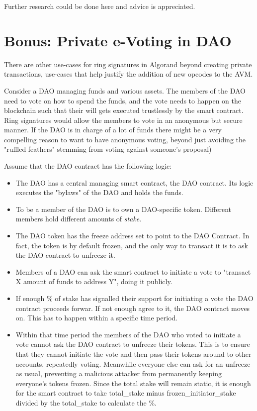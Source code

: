 \documentclass[9pt]{article}
\begin{document}
Further research could be done here and advice is appreciated.


\section{Bonus: Private e-Voting in DAO}

There are other use-cases for ring signatures in Algorand beyond creating private transactions, use-cases that help justify the addition of new opcodes to the AVM.

Consider a DAO managing funds and various assets. The members of the DAO need to vote on how to spend the funds, and the vote needs to happen on the blockchain such that their will gets executed trustlessly by the smart contract. Ring signatures would allow the members to vote in an anonymous but secure manner. If the DAO is in charge of a lot of funds there might be a very compelling reason to want to have anonymous voting, beyond just avoiding the "ruffled feathers" stemming from voting against someone's proposal)

Assume that the DAO contract has the following logic:

\begin{itemize}
    \item The DAO has a central managing smart contract, the DAO contract. Its logic executes the "bylaws" of the DAO and holds the funds.
    \item To be a member of the DAO is to own a DAO-specific token. Different members hold different amounts of \textit{stake}.
    \item The DAO token has the freeze address set to point to the DAO Contract. In fact, the token is by default frozen, and the only way to transact it is to ask the DAO contract to unfreeze it.
    \item Members of a DAO can ask the smart contract to initiate a vote to "transact X amount of funds to address Y", doing it publicly. 
    \item If enough \% of stake has signalled their support for initiating a vote the DAO contract proceeds forwar. If not enough agree to it, the DAO contract moves on. This has to happen within a specific time period.
    \item Within that time period the members of the DAO who voted to initiate a vote cannot ask the DAO contract to unfreeze their tokens. This is to ensure that they cannot initiate the vote and then pass their tokens around to other accounts, repeatedly voting. Meanwhile everyone else can ask for an unfreeze as usual, preventing a malicious attacker from permanently keeping everyone's tokens frozen. Since the total stake will remain static, it is enough for the smart contract to take total\_stake minus frozen\_initiator\_stake divided by the total\_stake to calculate the \%.
\end{itemize}
\end{document}
